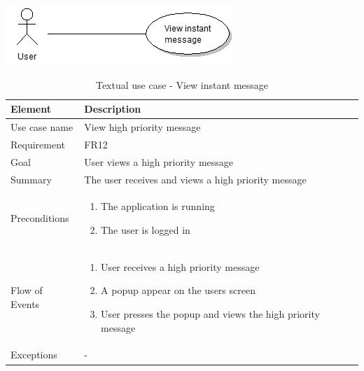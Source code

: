 \begin{table}
\begin{center}
\begin{center}
\includegraphics[width=\textwidth]{view_instant_message}
\end{center}
\begin{tabular}{p{3cm}|p{12cm}} \hline
Element & Description \\ \hline \hline
Use case name & View high priority message \\
Requirement & FR12 \\
Goal & User views a high priority message \\
Summary & The user receives and views a high priority message \\ \hline
Preconditions &
\begin{enumerate}
\item{}The application is running
\item{}The user is logged in
\end{enumerate} \\ \hline
Flow of Events &
\begin{enumerate}
\item{}User receives a high priority message
\item{}A popup appear on the users screen
\item{}User presses the popup and views the high priority message
\end{enumerate} \\ \hline
Exceptions & - \\ \hline
\end{tabular}
\end{center}
\caption{Textual use case - View instant message} \label{tab:createmessage}
\end{table}





